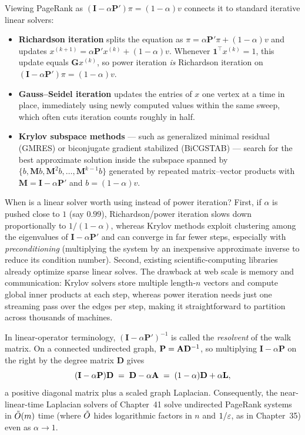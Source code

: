 Viewing PageRank as $(\mathbf{I}-\alpha\mathbf{P}')\pi = (1-\alpha)v$ connects it to standard iterative linear solvers:
\begin{itemize}
  \item \textbf{Richardson iteration} splits the equation as $\pi = \alpha\mathbf{P}'\pi + (1-\alpha)v$ and updates $x^{(k+1)} = \alpha\mathbf{P}'x^{(k)} + (1-\alpha)v$. Whenever $\mathbf{1}^\top x^{(k)} = 1$, this update equals $\mathbf{G}x^{(k)}$, so power iteration \emph{is} Richardson iteration on $(\mathbf{I}-\alpha\mathbf{P}')\pi = (1-\alpha)v$.
  \item \textbf{Gauss--Seidel iteration} updates the entries of $x$ one vertex at a time in place, immediately using newly computed values within the same sweep, which often cuts iteration counts roughly in half.
  \item \textbf{Krylov subspace methods} --- such as generalized minimal residual (GMRES) or biconjugate gradient stabilized (BiCGSTAB) --- search for the best approximate solution inside the subspace spanned by $\{b, \mathbf{M}b, \mathbf{M}^2b, \dots, \mathbf{M}^{k-1}b\}$ generated by repeated matrix--vector products with $\mathbf{M} = \mathbf{I}-\alpha\mathbf{P}'$ and $b = (1-\alpha)v$.
\end{itemize}

\begin{whybox}
When is a linear solver worth using instead of power iteration? First, if $\alpha$ is pushed close to $1$ (say $0.99$), Richardson/power iteration slows down proportionally to $1/(1-\alpha)$, whereas Krylov methods exploit clustering among the eigenvalues of $\mathbf{I}-\alpha\mathbf{P}'$ and can converge in far fewer steps, especially with \emph{preconditioning} (multiplying the system by an inexpensive approximate inverse to reduce its condition number). Second, existing scientific-computing libraries already optimize sparse linear solves. The drawback at web scale is memory and communication: Krylov solvers store multiple length-$n$ vectors and compute global inner products at each step, whereas power iteration needs just one streaming pass over the edges per step, making it straightforward to partition across thousands of machines.
\end{whybox}

\begin{connectionbox}
In linear-operator terminology, $(\mathbf{I}-\alpha\mathbf{P}')^{-1}$ is called the \emph{resolvent} of the walk matrix. On a connected undirected graph, $\mathbf{P} = \mathbf{A}\mathbf{D}^{-1}$, so multiplying $\mathbf{I} - \alpha\mathbf{P}$ on the right by the degree matrix $\mathbf{D}$ gives
\[
  (\mathbf{I} - \alpha\mathbf{P})\mathbf{D} \;=\; \mathbf{D} - \alpha\mathbf{A} \;=\; (1-\alpha)\mathbf{D} + \alpha\mathbf{L},
\]
a positive diagonal matrix plus a scaled graph Laplacian. Consequently, the near-linear-time Laplacian solvers of Chapter~41 solve undirected PageRank systems in $\tilde{O}(m)$ time (where $\tilde{O}$ hides logarithmic factors in $n$ and $1/\varepsilon$, as in Chapter~35) even as $\alpha \to 1$.
\end{connectionbox}


